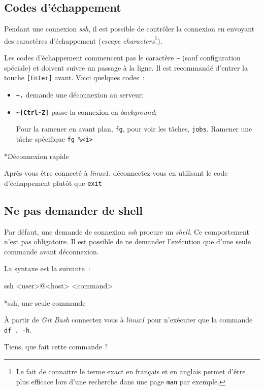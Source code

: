 \documentclass[a4paper,11pt]{article}
\begin{document}
\subsection{Codes d'échappement}

Pendant une connexion \textit{ssh}, il est possible de contrôler la connexion en
envoyant des caractères d'échappement (\textit{escape characters}\footnote{Le
	fait de connaitre le terme exact en français et en anglais permet d'être
	plus efficace lors d'une recherche dans une page \texttt{man} par exemple.
}). 

Les codes d'échappement commencent pas le caractère \texttt{\textasciitilde}
(sauf configuration spéciale) et doivent suivre un passage à la ligne. Il est
recommandé d'entrer la touche \texttt{[Enter]} avant. Voici quelques codes~:

\begin{itemize}
	\item \textbf{\texttt{\textasciitilde.}} demande une déconnexion au serveur;
	\item \textbf{\texttt{\textasciitilde[Ctrl-Z]}} passe la connexion en
		\textit{background};

		Pour la ramener en avant plan, \texttt{fg}, pour voir les tâches, 
		\texttt{jobs}. Ramener une tâche spécifique \texttt{fg \%<i>} 
\end{itemize}

\begin{Exercice}*{Déconnexion rapide}
	
	Après vous être connecté à \textit{linux1}, déconnectez vous en utilisant le
	code d'échappement plutôt que \texttt{exit}

\end{Exercice}


\subsection{Ne pas demander de shell}

Par défaut, une demande de connexion \textit{ssh} procure un \textit{shell}. Ce
comportement n'est pas obligatoire. Il est possible de ne demander l'exécution
que d'une seule commande avant déconnexion. 

La syntaxe est la suivante~:

\begin{Console}
	ssh <user>@<host> <command>
\end{Console}

\begin{Exercice}*{ssh, une seule commande}

	À partir de \textit{Git Bash} connectez vous à \textit{linux1} pour
	n'exécuter que la commande \\\texttt{df . -h}. 

	Tiens, que fait cette commande ? 

\end{Exercice}
\end{document}
